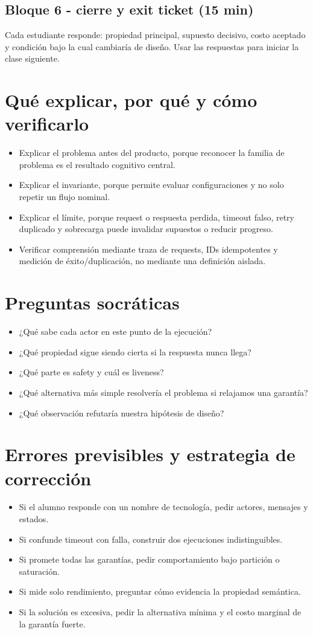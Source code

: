 \documentclass[variant=docente,cover=institutional,mode=screen]{ua-engineering-v6-article}
\begin{document}
\subsection*{Bloque 6 - cierre y exit ticket (15 min)}
Cada estudiante responde: propiedad principal, supuesto decisivo, costo aceptado y condición bajo la cual cambiaría de diseño. Usar las respuestas para iniciar la clase siguiente.

\section{Qué explicar, por qué y cómo verificarlo}
\begin{itemize}
\item Explicar el problema antes del producto, porque reconocer la familia de problema es el resultado cognitivo central.
\item Explicar el invariante, porque permite evaluar configuraciones y no solo repetir un flujo nominal.
\item Explicar el límite, porque request o respuesta perdida, timeout falso, retry duplicado y sobrecarga puede invalidar supuestos o reducir progreso.
\item Verificar comprensión mediante traza de requests, IDs idempotentes y medición de éxito/duplicación, no mediante una definición aislada.
\end{itemize}

\section{Preguntas socráticas}
\begin{itemize}
\item ¿Qué sabe cada actor en este punto de la ejecución?
\item ¿Qué propiedad sigue siendo cierta si la respuesta nunca llega?
\item ¿Qué parte es safety y cuál es liveness?
\item ¿Qué alternativa más simple resolvería el problema si relajamos una garantía?
\item ¿Qué observación refutaría nuestra hipótesis de diseño?
\end{itemize}

\section{Errores previsibles y estrategia de corrección}
\begin{itemize}
\item Si el alumno responde con un nombre de tecnología, pedir actores, mensajes y estados.
\item Si confunde timeout con falla, construir dos ejecuciones indistinguibles.
\item Si promete todas las garantías, pedir comportamiento bajo partición o saturación.
\item Si mide solo rendimiento, preguntar cómo evidencia la propiedad semántica.
\item Si la solución es excesiva, pedir la alternativa mínima y el costo marginal de la garantía fuerte.
\end{itemize}
\end{document}
